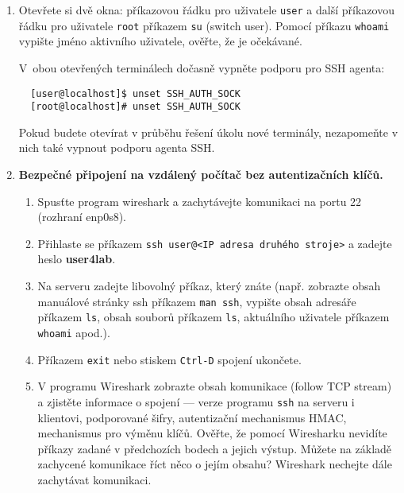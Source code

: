 \documentclass[a4paper,11pt]{article}
\begin{document}
\begin{enumerate}

  \item Otevřete si dvě okna: příkazovou řádku pro uživatele {\tt user} a další příkazovou řádku pro uživatele {\tt root} příkazem {\tt su} (switch user).
Pomocí příkazu {\tt whoami} vypište jméno aktivního uživatele, ověřte, že je očekávané.

    V~obou otevřených terminálech dočasně vypněte podporu pro SSH agenta:
  \begin{lstlisting}
  [user@localhost]$ unset SSH_AUTH_SOCK
  [root@localhost]# unset SSH_AUTH_SOCK
  \end{lstlisting}

  Pokud budete otevírat v průběhu řešení úkolu nové terminály, nezapomeňte
    v nich také vypnout podporu agenta SSH.

  \item {\bf Bezpečné připojení na vzdálený počítač bez autentizačních klíčů.}

    \begin{enumerate}

      \item Spusťte program wireshark a zachytávejte komunikaci na portu 22 (rozhraní enp0s8).

      \item Přihlaste se příkazem {\tt ssh user@<IP adresa druhého stroje>} a zadejte heslo \textbf{user4lab}.

      \item Na serveru zadejte libovolný příkaz, který znáte (např. zobrazte obsah manuálové stránky ssh příkazem {\tt man ssh}, vypište obsah adresáře příkazem {\tt ls}, obsah souborů příkazem {\tt ls}, aktuálního uživatele příkazem {\tt whoami} apod.).

      \item Příkazem {\tt exit} nebo stiskem {\tt Ctrl-D} spojení ukončete.

      \item V programu Wireshark zobrazte obsah komunikace (follow TCP stream) a zjistěte informace o spojení --- verze programu {\tt ssh} na serveru i klientovi, podporované šifry, autentizační mechanismus HMAC, mechanismus pro výměnu klíčů.
        Ověřte, že pomocí Wiresharku nevidíte příkazy zadané v předchozích bodech a jejich výstup.
        Můžete na základě zachycené komunikace říct něco o jejím obsahu?
        Wireshark nechejte dále zachytávat komunikaci.

    \end{enumerate}


\end{enumerate}
\end{document}
